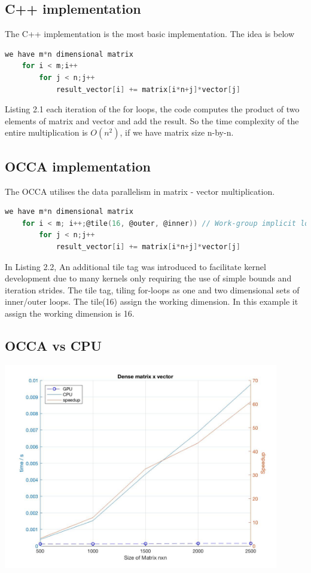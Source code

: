 \subsection{C++ implementation}
The C++ implementation is the most basic implementation. The idea is below\\

\begin{lstlisting}[language=C, caption=matrix vector multiplication in CPU/C++]
	we have m*n dimensional matrix
	for i < m;i++
		for j < n;j++
			result_vector[i] += matrix[i*n+j]*vector[j]
\end{lstlisting}

Listing 2.1 each iteration of the for loops, the code computes the product of two elements of matrix and vector and add the result. So the time complexity of the entire multiplication is $O(n^2)$, if we have matrix size n-by-n.




\subsection{OCCA implementation}
The OCCA utilises the data parallelism in matrix - vector multiplication.\\
\begin{lstlisting}[language=C, caption=matrix vector multiplication in OCCA]
	we have m*n dimensional matrix
	for i < m; i++;@tile(16, @outer, @inner)) // Work-group implicit loops
		for j < n;j++
			result_vector[i] += matrix[i*n+j]*vector[j]
\end{lstlisting}
In Listing 2.2, An additional tile tag was introduced to facilitate kernel development due to many kernels only requiring the use of simple bounds and iteration strides. The tile tag, tiling for-loops as one and two dimensional sets of inner/outer loops. The tile(16) assign the working dimension. In this example it assign the working dimension is 16. 
\subsection{OCCA vs CPU}

\begin{center}
	\includegraphics[width = 12cm]{chapters/dense_matrix_vector.jpg}
	\label{img:1}
\end{center}

